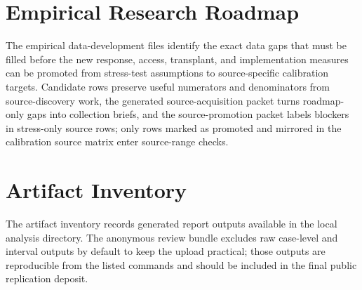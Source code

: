 \documentclass[
  journal=small,
  manuscript=research-article,
  year=2026
]{cup-journal}
\begin{document}
\section*{Empirical Research Roadmap}
The empirical data-development files identify the exact data gaps that must be filled before the new response, access, transplant, and implementation measures can be promoted from stress-test assumptions to source-specific calibration targets. Candidate rows preserve useful numerators and denominators from source-discovery work, the generated source-acquisition packet turns roadmap-only gaps into collection briefs, and the source-promotion packet labels blockers in stress-only source rows; only rows marked as promoted and mirrored in the calibration source matrix enter source-range checks.


\section*{Artifact Inventory}
The artifact inventory records generated report outputs available in the local analysis directory. The anonymous review bundle excludes raw case-level and interval outputs by default to keep the upload practical; those outputs are reproducible from the listed commands and should be included in the final public replication deposit.

\end{document}
